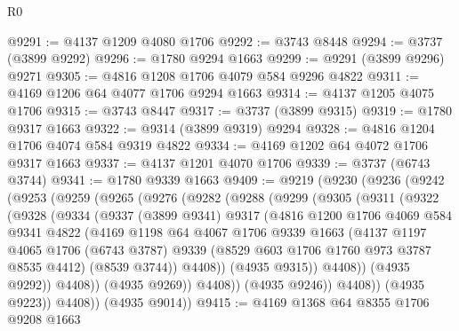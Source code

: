 \begin{lexlean}{R0}
\begin{coremodule}
@9291 := @4137 @1209 @4080 @1706
@9292 := @3743 @8448
@9294 := @3737 (@3899 @9292)
@9296 := @1780 @9294 @1663
@9299 := @9291 (@3899 @9296) @9271
@9305 := @4816 @1208 @1706 @4079 @584 @9296 @4822
@9311 := @4169 @1206 @64 @4077 @1706 @9294 @1663
@9314 := @4137 @1205 @4075 @1706
@9315 := @3743 @8447
@9317 := @3737 (@3899 @9315)
@9319 := @1780 @9317 @1663
@9322 := @9314 (@3899 @9319) @9294
@9328 := @4816 @1204 @1706 @4074 @584 @9319 @4822
@9334 := @4169 @1202 @64 @4072 @1706 @9317 @1663
@9337 := @4137 @1201 @4070 @1706
@9339 := @3737 (@6743 @3744)
@9341 := @1780 @9339 @1663
@9409 := @9219
    (@9230
      (@9236
        (@9242
          (@9253
            (@9259
              (@9265
                (@9276
                  (@9282
                    (@9288
                      (@9299
                        (@9305
                          (@9311
                            (@9322
                              (@9328
                                (@9334
                                  (@9337
                                    (@3899 @9341)
                                    @9317
                                    (@4816
                                      @1200
                                      @1706
                                      @4069
                                      @584
                                      @9341
                                      @4822
                                      (@4169
                                        @1198
                                        @64
                                        @4067
                                        @1706
                                        @9339
                                        @1663
                                        (@4137
                                          @1197
                                          @4065
                                          @1706
                                          (@6743 @3787)
                                          @9339
                                          (@8529 @603 @1706 @1760 @973 @3787 @8535 @4412)
                                          (@8539 @3744))
                                        @4408))
                                    (@4935 @9315))
                                  @4408))
                              (@4935 @9292))
                            @4408))
                        (@4935 @9269))
                      @4408))
                  (@4935 @9246))
                @4408))
            (@4935 @9223))
          @4408))
      (@4935 @9014))
@9415 := @4169 @1368 @64 @8355 @1706 @9208 @1663

\end{coremodule}
\end{lexlean}

